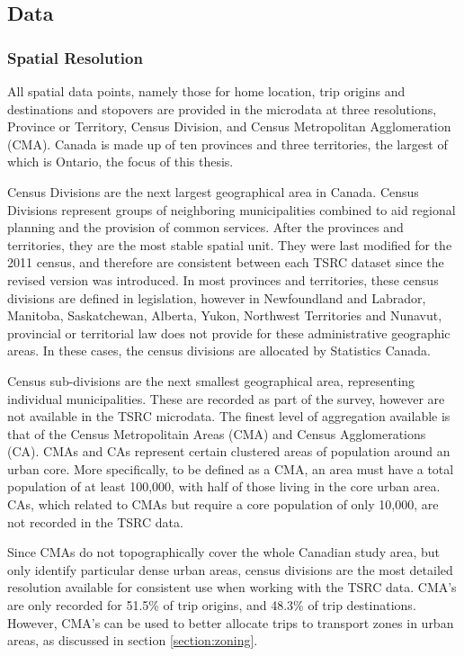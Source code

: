 \subsection{Data}
\label{section:tsrcdata}
\subsubsection{Spatial Resolution}
All spatial data points, namely those for home location, trip origins and destinations and stopovers are provided in the microdata at three resolutions, Province or Territory, Census Division, and Census Metropolitan Agglomeration (CMA). Canada is made up of ten provinces and three territories, the largest of which is Ontario, the focus of this thesis. 

Census Divisions are the next largest geographical area in Canada. Census Divisions represent groups of neighboring municipalities combined to aid regional planning and the provision of common services. After the provinces and territories, they are the most stable spatial unit. They were last modified for the 2011 census, and therefore are consistent between each TSRC dataset since the revised version was introduced. In most provinces and territories, these census divisions are defined in legislation, however in Newfoundland and Labrador, Manitoba, Saskatchewan, Alberta, Yukon, Northwest Territories and Nunavut, provincial or territorial law does not provide for these administrative geographic areas. In these cases, the census divisions are allocated by Statistics Canada.

Census sub-divisions are the next smallest geographical area, representing individual municipalities. These are recorded as part of the survey, however are not available in the TSRC microdata. The finest level of aggregation available is that of the Census Metropolitain Areas (CMA) and Census Agglomerations (CA). CMAs and CAs represent certain clustered areas of population around an urban core. More specifically, to be defined as a CMA, an area must have a total population of at least 100,000, with half of those living in the core urban area. CAs, which related to CMAs but require a core population of only 10,000, are not recorded in the TSRC data. 

Since CMAs do not topographically cover the whole Canadian study area, but only identify particular dense urban areas, census divisions are the most detailed resolution available for consistent use when working with the TSRC data. CMA’s are only recorded for 51.5\% of trip origins, and 48.3\% of trip destinations. However, CMA's can be used to better allocate trips to transport zones in urban areas, as discussed in section \ref{section:zoning}.

